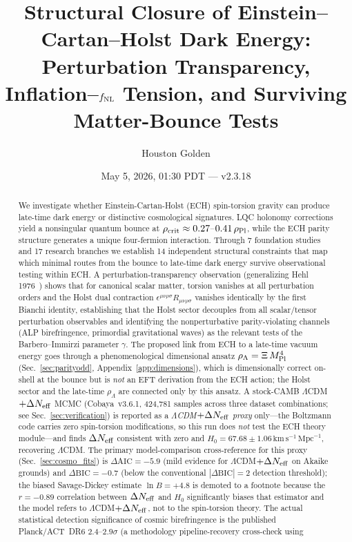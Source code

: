 \documentclass[aps,prd,twocolumn,superscriptaddress,showpacs,preprintnumbers,nofootinbib,longbibliography,floatfix]{revtex4-2}
\newcommand{\Neff}{N_{\rm eff}}
\newcommand{\paperVersion}{v2.3.18}
\begin{document}

\title{Structural Closure of Einstein--Cartan--Holst Dark Energy:\\
Perturbation Transparency, Inflation--$f_{\rm NL}$ Tension, and Surviving Matter-Bounce Tests}

\author{Houston Golden}

\date{May 5, 2026, 01:30 PDT --- \paperVersion}

\begin{abstract}
We investigate whether Einstein-Cartan-Holst (ECH) spin-torsion gravity can produce late-time dark energy or distinctive cosmological signatures. LQC holonomy corrections yield a nonsingular quantum bounce at $\rho_{\rm crit} \approx 0.27$--$0.41\,\rho_{\rm Pl}$, while the ECH parity structure generates a unique four-fermion interaction. Through 7 foundation studies and 17 research branches we establish 14 independent structural constraints that map which minimal routes from the bounce to late-time dark energy survive observational testing within ECH. A perturbation-transparency observation (generalizing Hehl 1976~\cite{Hehl1976}) shows that for canonical scalar matter, torsion vanishes at all perturbation orders and the Holst dual contraction $\epsilon^{\mu\nu\rho\sigma}R_{\mu\nu\rho\sigma}$ vanishes identically by the first Bianchi identity, establishing that the Holst sector decouples from all scalar/tensor perturbation observables and identifying the nonperturbative parity-violating channels (ALP birefringence, primordial gravitational waves) as the relevant tests of the Barbero--Immirzi parameter $\gamma$. The proposed link from ECH to a late-time vacuum energy goes through a phenomenological dimensional ansatz $\rho_\Lambda = \Xi\,M_{\rm Pl}^4$ (Sec.~\ref{sec:parityodd}, Appendix~\ref{app:dimensions}), which is dimensionally correct on-shell at the bounce but is \emph{not} an EFT derivation from the ECH action; the Holst sector and the late-time $\rho_\Lambda$ are connected only by this ansatz. A stock-CAMB $\Lambda$CDM$+\Delta\Neff$ MCMC (Cobaya~v3.6.1, 424{,}781 samples across three dataset combinations; see Sec.~\ref{sec:verification}) is reported as a \emph{$\Lambda$CDM$+\Delta\Neff$ proxy} only---the Boltzmann code carries zero spin-torsion modifications, so this run does \emph{not} test the ECH theory module---and finds $\Delta\Neff$ consistent with zero and $H_0 = 67.68\pm 1.06\,\text{km}\,\text{s}^{-1}\,\text{Mpc}^{-1}$, recovering $\Lambda$CDM. The primary model-comparison cross-reference for this proxy (Sec.~\ref{sec:cosmo_fits}) is $\Delta\text{AIC} = -5.9$ (mild evidence for $\Lambda$CDM$+\Delta\Neff$ on Akaike grounds) and $\Delta\text{BIC} = -0.7$ (below the conventional $|\Delta\text{BIC}|=2$ detection threshold); the biased Savage-Dickey estimate $\ln B = +4.8$ is demoted to a footnote because the $r=-0.89$ correlation between $\Delta\Neff$ and $H_0$ significantly biases that estimator and the model refers to $\Lambda$CDM$+\Delta\Neff$, not to the spin-torsion theory. The actual statistical detection significance of cosmic birefringence is the published Planck/ACT~DR6 $2.4$--$2.9\sigma$ (a methodology pipeline-recovery cross-check using 
\end{abstract}
\end{document}

